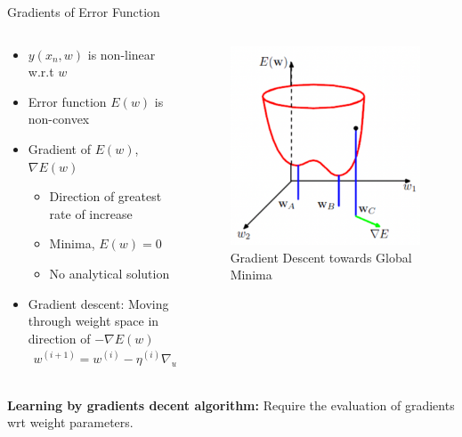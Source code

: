 \documentclass[10pt, hyperref={colorlinks = true,linkcolor = blue}]{beamer}
\begin{document}
{{{\begin{frame}{Gradients of Error Function}

\begin{columns}
        \begin{column}{0.6\textwidth}
\begin{itemize}
    \item $y(x_n, w)$ is non-linear w.r.t $w$
    \item Error function $E(w)$ is non-convex
    \item Gradient of $E(w)$, $\nabla E(w)$
    \begin{itemize}
        \item Direction of greatest rate of increase
        \item Minima, $E( w) = 0$
        \item No analytical solution
    \end{itemize}
    \item Gradient descent: Moving through weight space in direction of $-\nabla E( w)$
    \begin{align*}
        w^{(i +1)} = w^{(i)} - \eta^{(i)} \nabla_w E( w^{i}).
    \end{align*}
\end{itemize}
\end{column}
 \begin{column}{0.4\textwidth}
\begin{figure}
    \includegraphics[width=\linewidth]{figures/GlobalMinima}
    \caption{Gradient Descent towards Global Minima}
\end{figure}
\end{column}
\end{columns}
\textbf{Learning by gradients decent algorithm:} Require the evaluation of gradients wrt weight parameters.
\end{frame}


}}}
\end{document}
